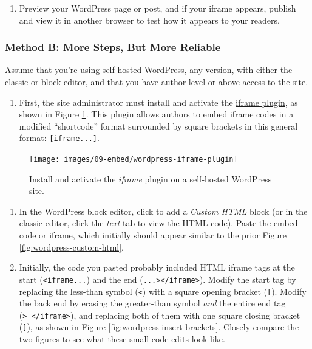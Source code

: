 \documentclass[
  english,
]{book}
\providecommand{\tightlist}{%
  \setlength{\itemsep}{0pt}\setlength{\parskip}{0pt}}
\begin{document}
\begin{enumerate}
\def\labelenumi{\arabic{enumi}.}
\setcounter{enumi}{1}
\tightlist
\item
  Preview your WordPress page or post, and if your iframe appears, publish and view it in another browser to test how it appears to your readers.
\end{enumerate}

\hypertarget{method-b-more-steps-but-more-reliable}{%
\subsubsection*{Method B: More Steps, But More Reliable}\label{method-b-more-steps-but-more-reliable}}

Assume that you're using self-hosted WordPress, any version, with either the classic or block editor, and that you have author-level or above access to the site.

\begin{enumerate}
\def\labelenumi{\arabic{enumi}.}
\tightlist
\item
  First, the site administrator must install and activate the \href{https://wordpress.org/plugins/iframe/}{iframe plugin}, as shown in Figure \ref{fig:wordpress-iframe-plugin}. This plugin allows authors to embed iframe codes in a modified ``shortcode'' format surrounded by square brackets in this general format: \texttt{{[}iframe...{]}}.
\end{enumerate}



\begin{figure}
\texttt{[image: images/09-embed/wordpress-iframe-plugin]} \caption{Install and activate the \emph{iframe} plugin on a self-hosted WordPress site.}\label{fig:wordpress-iframe-plugin}
\end{figure}

\begin{enumerate}
\def\labelenumi{\arabic{enumi}.}
\setcounter{enumi}{1}
\item
  In the WordPress block editor, click to add a \emph{Custom HTML} block (or in the classic editor, click the \emph{text} tab to view the HTML code). Paste the embed code or iframe, which initially should appear similar to the prior Figure \ref{fig:wordpress-custom-html}.
\item
  Initially, the code you pasted probably included HTML iframe tags at the start (\texttt{\textless{}iframe...}) and the end (\texttt{...\textgreater{}\textless{}/iframe\textgreater{}}). Modify the start tag by replacing the less-than symbol (\texttt{\textless{}}) with a square opening bracket (\texttt{{[}}). Modify the back end by erasing the greater-than symbol \emph{and} the entire end tag (\texttt{\textgreater{}\ \textless{}/iframe\textgreater{}}), and replacing both of them with one square closing bracket (\texttt{{]}}), as shown in Figure \ref{fig:wordpress-insert-brackets}. Closely compare the two figures to see what these small code edits look like.
\end{enumerate}
\end{document}
